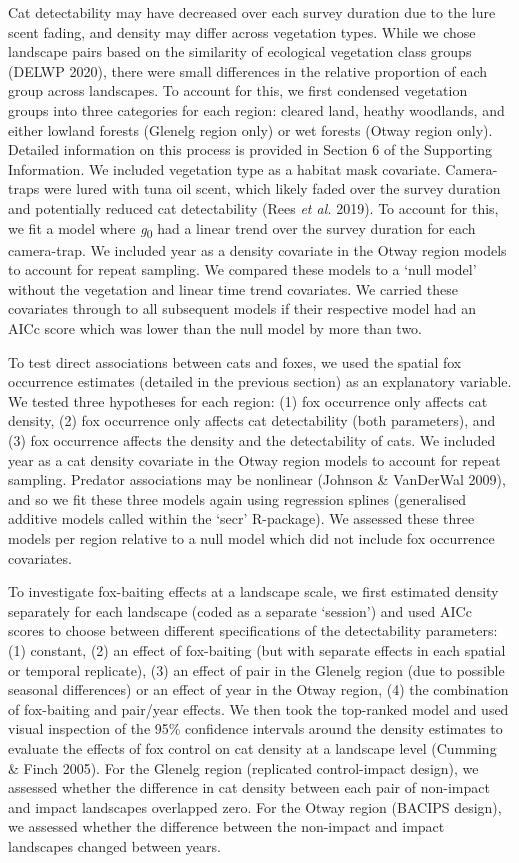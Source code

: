 \documentclass[]{elsarticle} %
\begin{document}
Cat detectability may have decreased over each survey duration due to the lure scent fading, and density may differ across vegetation types. While we chose landscape pairs based on the similarity of ecological vegetation class groups (DELWP 2020), there were small differences in the relative proportion of each group across landscapes. To account for this, we first condensed vegetation groups into three categories for each region: cleared land, heathy woodlands, and either lowland forests (Glenelg region only) or wet forests (Otway region only). Detailed information on this process is provided in Section 6 of the Supporting Information. We included vegetation type as a habitat mask covariate. Camera-traps were lured with tuna oil scent, which likely faded over the survey duration and potentially reduced cat detectability (Rees \emph{et al.} 2019). To account for this, we fit a model where \emph{g}\textsubscript{0} had a linear trend over the survey duration for each camera-trap. We included year as a density covariate in the Otway region models to account for repeat sampling. We compared these models to a `null model' without the vegetation and linear time trend covariates. We carried these covariates through to all subsequent models if their respective model had an AICc score which was lower than the null model by more than two.

To test direct associations between cats and foxes, we used the spatial fox occurrence estimates (detailed in the previous section) as an explanatory variable. We tested three hypotheses for each region: (1) fox occurrence only affects cat density, (2) fox occurrence only affects cat detectability (both parameters), and (3) fox occurrence affects the density and the detectability of cats. We included year as a cat density covariate in the Otway region models to account for repeat sampling. Predator associations may be nonlinear (Johnson \& VanDerWal 2009), and so we fit these three models again using regression splines (generalised additive models called within the `secr' R-package). We assessed these three models per region relative to a null model which did not include fox occurrence covariates.

To investigate fox-baiting effects at a landscape scale, we first estimated density separately for each landscape (coded as a separate `session') and used AICc scores to choose between different specifications of the detectability parameters: (1) constant, (2) an effect of fox-baiting (but with separate effects in each spatial or temporal replicate), (3) an effect of pair in the Glenelg region (due to possible seasonal differences) or an effect of year in the Otway region, (4) the combination of fox-baiting and pair/year effects. We then took the top-ranked model and used visual inspection of the 95\% confidence intervals around the density estimates to evaluate the effects of fox control on cat density at a landscape level (Cumming \& Finch 2005). For the Glenelg region (replicated control-impact design), we assessed whether the difference in cat density between each pair of non-impact and impact landscapes overlapped zero. For the Otway region (BACIPS design), we assessed whether the difference between the non-impact and impact landscapes changed between years.
\end{document}
